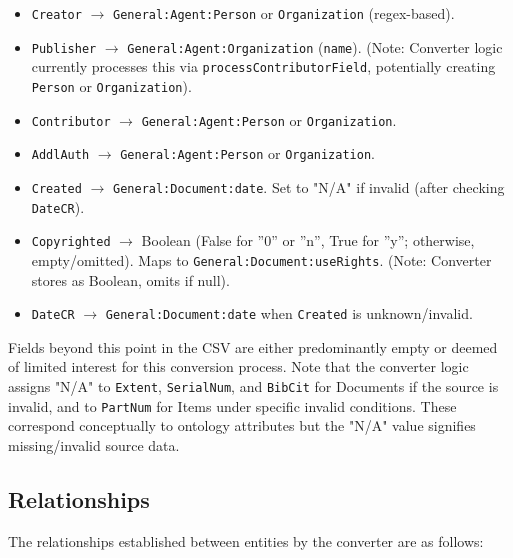 \documentclass[11pt, a4paper]{article}
\begin{document}
\begin{itemize}
    \item \texttt{Creator} $\rightarrow$ \texttt{General:Agent:Person} or \texttt{Organization} (regex-based).
    \item \texttt{Publisher} $\rightarrow$ \texttt{General:Agent:Organization} (\texttt{name}). (Note: Converter logic currently processes this via \texttt{processContributorField}, potentially creating \texttt{Person} or \texttt{Organization}).
    \item \texttt{Contributor} $\rightarrow$ \texttt{General:Agent:Person} or \texttt{Organization}.
    \item \texttt{AddlAuth} $\rightarrow$ \texttt{General:Agent:Person} or \texttt{Organization}.
    \item \texttt{Created} $\rightarrow$ \texttt{General:Document:date}. Set to "N/A" if invalid (after checking \texttt{DateCR}).
    \item \texttt{Copyrighted} $\rightarrow$ Boolean (False for ”0” or ”n”, True for ”y”; otherwise, empty/omitted). Maps to \texttt{General:Document:useRights}. (Note: Converter stores as Boolean, omits if null).
    \item \texttt{DateCR} $\rightarrow$ \texttt{General:Document:date} when \texttt{Created} is unknown/invalid.
\end{itemize}
Fields beyond this point in the CSV are either predominantly empty or deemed of limited interest for this conversion process. Note that the converter logic assigns "N/A" to \texttt{Extent}, \texttt{SerialNum}, and \texttt{BibCit} for Documents if the source is invalid, and to \texttt{PartNum} for Items under specific invalid conditions. These correspond conceptually to ontology attributes but the "N/A" value signifies missing/invalid source data.

\subsection{Relationships}
The relationships established between entities by the converter are as follows:
\end{document}
